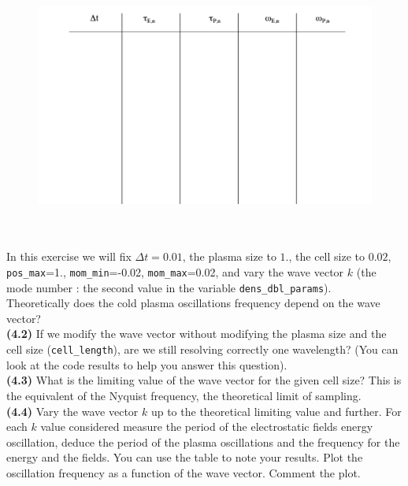 \documentclass[10pt]{article}
\begin{document}
 
\begin{figure}
\resizebox{!}{110mm}
{\includegraphics{table.png}}
\end{figure}


$ $\\
\\
In this exercise we will fix $\Delta t = 0.01$, the plasma size to $1.$, the cell size to $0.02$, \texttt{pos\_max}=1., \texttt{mom\_min}=-0.02, \mbox{\texttt{mom\_max}=0.02}, and vary the wave vector $k$ (the mode number : the second value in the variable \texttt{dens\_dbl\_params}). \\
  Theoretically does the cold plasma oscillations frequency depend on the wave vector? \\
{\bf (4.2)} If we modify the wave vector without modifying the plasma size and the cell size (\texttt{cell\_length}), are we still resolving correctly one wavelength? (You can look at the code results to help you answer this question). \\
{\bf (4.3)} What is the limiting value of the wave vector for the given cell size? This is the equivalent of the Nyquist frequency, the theoretical limit of sampling. \\
{\bf (4.4)} Vary the wave vector $k$ up to the theoretical limiting value  and further. For each $k$ value considered measure the period of the electrostatic fields energy oscillation, deduce the period of the plasma oscillations and the frequency for the energy and the fields. 
You can use the table to note your results. Plot the oscillation frequency as a function of the wave vector. Comment the plot. \\
\end{document}
